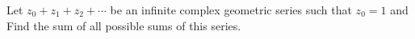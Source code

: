 Let $z_0+z_1+z_2+\cdots$ be an infinite complex geometric series such that $z_0=1$ and   Find the sum of all possible sums of this series.